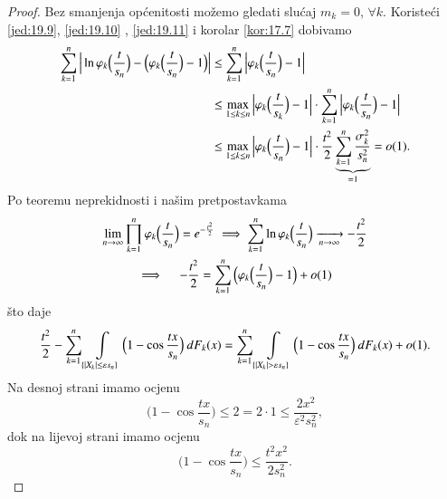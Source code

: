 \begin{proof}
    Bez smanjenja op\' cenitosti mo\v zemo gledati slu\' caj $m_k = 0$, $\forall k$.
    Koriste\' ci \eqref{jed:19.9}, \eqref{jed:19.10} , \eqref{jed:19.11} i korolar \ref{kor:17.7} dobivamo
    \begin{equation*}
        \begin{aligned}
            \sum\limits_{k = 1}^{n} \Big| \ln \varphi_k \Big( \frac{t}{s_n} \Big) - \Big( \varphi_k \Big( \frac{t}{s_n} \Big) - 1  \Big) \Big| &\leq \sum\limits_{k = 1}^{n} \Big| \varphi_k \Big( \frac{t}{s_n} \Big) - 1 \Big|\\
            &\leq \max_{1 \leq k \leq n} \Big| \varphi_k \Big( \frac{t}{s_k} \Big) - 1 \Big| \cdot \sum\limits_{k = 1}^{n} \Big| \varphi_k \Big( \frac{t}{s_n} \Big) -1 \Big|\\
            &\leq \max\limits_{1 \leq k \leq n} \Big| \varphi_k \Big( \frac{t}{s_n} \Big) - 1 \Big| \cdot \frac{t^2}{2} \underbrace{\sum\limits_{k = 1}^{n} \frac{\sigma_k^2}{s_n^2} }_{= 1} = o(1).    
        \end{aligned}
    \end{equation*}
    Po teoremu neprekidnosti i na\v sim pretpostavkama
    \begin{equation*}
        \begin{gathered}
            \lim\limits_{n \to \infty} \prod\limits_{k = 1}^{n} \varphi_k \Big( \frac{t}{s_n} \Big) = e^{-\frac{t^2}{2}} \implies \sum\limits_{k = 1}^{n} \ln \varphi_k \Big( \frac{t}{s_n} \Big) \xrightarrow[n \to \infty]{} -\frac{t^2}{2}\\
            \implies \quad -\frac{t^2}{2} = \sum\limits_{k = 1}^{n} \Big( \varphi_k \Big( \frac{t}{s_n} \Big) -1 \Big) + o(1)
        \end{gathered}
    \end{equation*}
    \v sto daje
    \begin{equation*}
        \frac{t^2}{2} - \sum\limits_{k = 1}^{n} \int\limits_{\{ |X_k| \leq \varepsilon s_n \}} \Big( 1 - \cos \frac{tx}{s_n} \Big) \: d F_k (x) = \sum\limits_{k = 1}^{n} \int\limits_{\{ |X_k| > \varepsilon s_n \}} \Big( 1 - \cos \frac{tx}{s_n} \Big) \: d F_k (x) + o(1).
    \end{equation*}
    Na desnoj strani imamo ocjenu
    \begin{equation*}
        \Big( 1 - \cos \frac{tx}{s_n} \Big) \leq 2 = 2 \cdot 1 \leq  \frac{2x^2}{\varepsilon^2 s_n^2},
    \end{equation*}
    dok na lijevoj strani imamo ocjenu
    \begin{equation*}
        \Big( 1 - \cos \frac{tx}{s_n} \Big) \leq \frac{t^2 x^2}{2 s_n^2}.

\end{equation*}
\end{proof}
